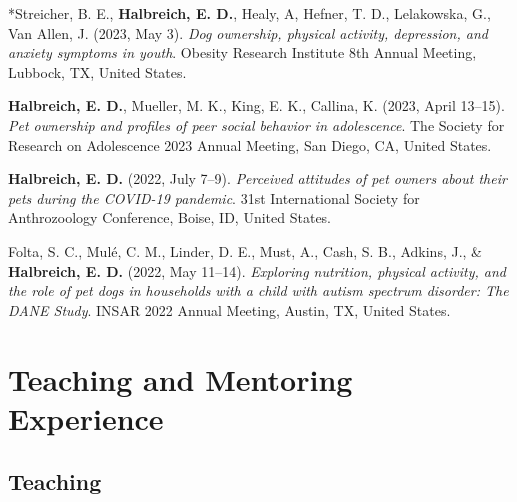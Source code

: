 \documentclass[10pt,a4paper,]{article}
\begin{document}
*Streicher, B. E., \textbf{Halbreich, E. D.}, Healy, A, Hefner, T. D.,
Lelakowska, G., Van Allen, J. (2023, May 3). \emph{Dog ownership,
physical activity, depression, and anxiety symptoms in youth}. Obesity
Research Institute 8th Annual Meeting, Lubbock, TX, United States.

\textbf{Halbreich, E. D.}, Mueller, M. K., King, E. K., Callina, K.
(2023, April 13--15). \emph{Pet ownership and profiles of peer social
behavior in adolescence}. The Society for Research on Adolescence 2023
Annual Meeting, San Diego, CA, United States.

\textbf{Halbreich, E. D.} (2022, July 7--9). \emph{Perceived attitudes
of pet owners about their pets during the COVID-19 pandemic}. 31st
International Society for Anthrozoology Conference, Boise, ID, United
States.

Folta, S. C., Mulé, C. M., Linder, D. E., Must, A., Cash, S. B., Adkins,
J., \& \textbf{Halbreich, E. D.} (2022, May 11--14). \emph{Exploring
nutrition, physical activity, and the role of pet dogs in households
with a child with autism spectrum disorder: The DANE Study}. INSAR 2022
Annual Meeting, Austin, TX, United States.

\endgroup

\hypertarget{teaching-and-mentoring-experience}{%
\section{Teaching and Mentoring
Experience}\label{teaching-and-mentoring-experience}}

\hypertarget{teaching}{%
\subsection{Teaching}\label{teaching}}
\end{document}
